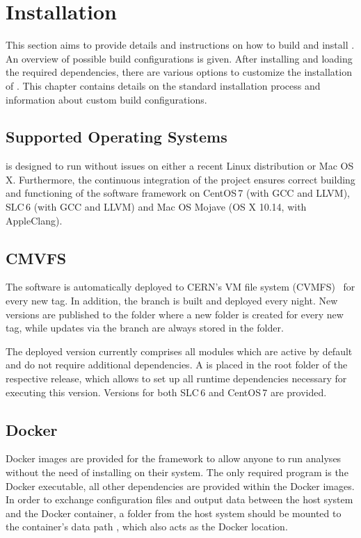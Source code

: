 \chapter{Installation}
\label{ch:installation}

This section aims to provide details and instructions on how to build and install \corry.
An overview of possible build configurations is given.
After installing and loading the required dependencies, there are various options to customize the installation of \corry.
This chapter contains details on the standard installation process and information about custom build configurations.

\section{Supported Operating Systems}
\label{sec:os}
\corry is designed to run without issues on either a recent Linux distribution or Mac OS\,X.
Furthermore, the continuous integration of the project ensures correct building and functioning of the software framework on CentOS\,7 (with GCC and LLVM), SLC\,6 (with GCC and LLVM) and Mac OS Mojave (OS X 10.14, with AppleClang).

\section{CMVFS}
\label{sec:cvmfs}
The software is automatically deployed to CERN's VM file system (CVMFS)~\cite{cvmfs} for every new tag.
In addition, the  branch is built and deployed every night.
New versions are published to the folder  where a new folder is created for every new tag, while updates via the  branch are always stored in the  folder.

The deployed version currently comprises all modules which are active by default and do not require additional dependencies.
A  is placed in the root folder of the respective release, which allows to set up all runtime dependencies necessary for executing this version.
Versions for both SLC\,6 and CentOS\,7 are provided.

\section{Docker}
\label{sec:docker}
Docker images are provided for the framework to allow anyone to run analyses without the need of installing \corry on their system.
The only required program is the Docker executable, all other dependencies are provided within the Docker images.
In order to exchange configuration files and output data between the host system and the Docker container, a folder from the host system should be mounted to the container's data path , which also acts as the Docker  location.


